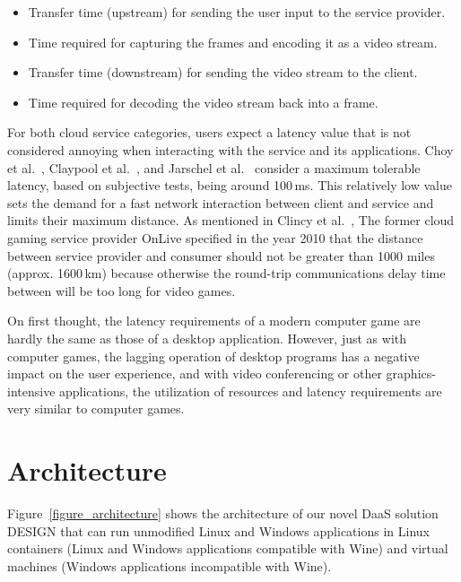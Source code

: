 \documentclass[runningheads]{llncs}
\begin{document}
\begin{itemize}
\item Transfer time (upstream) for sending the user input to the service provider.
\item Time required for capturing the frames and encoding it as a video stream.
\item Transfer time (downstream) for sending the video stream to the client.
\item Time required for decoding the video stream back into a frame.
\end{itemize}

For both cloud service categories, users expect a latency value that is not considered annoying when interacting with the service and its applications. Choy et al.~\cite{ChoyWongSimonRosenberg2012}, Claypool et al.~\cite{claypool2010latency}, and Jarschel et al.~\cite{jarschel2011evaluation} consider a maximum tolerable latency, based on subjective tests, being around 100\,ms. This relatively low value sets the demand for a fast network interaction between client and service and limits their maximum distance. As mentioned in Clincy et al.~\cite{clincy2013subjective}, The former cloud gaming service provider OnLive specified in the year 2010 that the distance between service provider and consumer should not be greater than 1000 miles (approx. 1600\,km) because otherwise the round-trip communications delay time between will be too long for video games. 

On first thought, the latency requirements of a modern computer game are hardly the same as those of a desktop application. However, just as with computer games, the lagging operation of desktop programs has a negative impact on the user experience, and with video conferencing or other graphics-intensive applications, the utilization of resources and latency requirements are very similar to computer games.

\section{Architecture}
\label{sec:RecommendDaaSarchitecture}
% 

Figure~\ref{figure_architecture} shows the architecture of our novel DaaS solution DESIGN that can run unmodified Linux and Windows applications in Linux containers (Linux and Windows applications compatible with Wine) and virtual machines (Windows applications incompatible with Wine).
\end{document}
